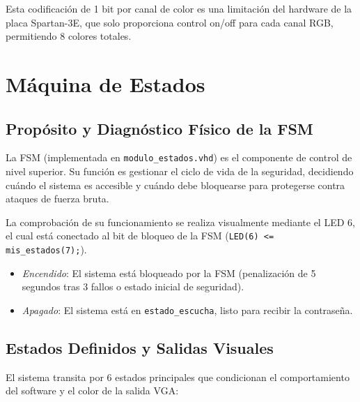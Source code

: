 \documentclass[a4paper, 12pt]{report}
\begin{document}
Esta codificación de 1 bit por canal de color es una limitación del hardware de la placa Spartan-3E, que solo proporciona control on/off para cada canal RGB, permitiendo 8 colores totales.


\section{Máquina de Estados}

\subsection{Propósito y Diagnóstico Físico de la FSM}

La FSM (implementada en \texttt{modulo\_estados.vhd}) es el componente de control de nivel superior. Su función es gestionar el ciclo de vida de la seguridad, decidiendo cuándo el sistema es accesible y cuándo debe bloquearse para protegerse contra ataques de fuerza bruta.

La comprobación de su funcionamiento se realiza visualmente mediante el LED 6, el cual está conectado al bit de bloqueo de la FSM (\texttt{LED(6) <= mis\_estados(7);}).

    \begin{itemize}
        \item \textit{Encendido}: El sistema está bloqueado por la FSM (penalización de 5 segundos tras 3 fallos o estado inicial de seguridad).
        \item \textit{Apagado}: El sistema está en \texttt{estado\_escucha}, listo para recibir la contraseña.
    \end{itemize}

\subsection{Estados Definidos y Salidas Visuales}

El sistema transita por 6 estados principales que condicionan el comportamiento del software y el color de la salida VGA:
\end{document}
